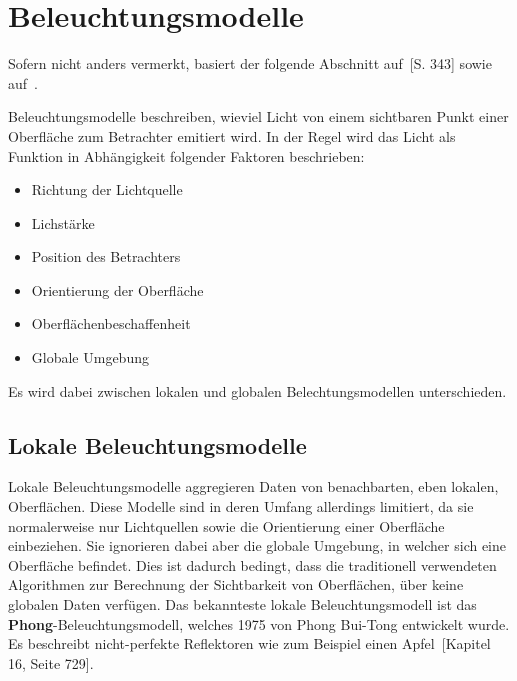 
\section{Beleuchtungsmodelle}
\label{sec:illumination_models}

Sofern nicht anders vermerkt, basiert der folgende Abschnitt auf~\cite{whitted_improved_1980}[S. 343] sowie auf~\cite{hughes_computer_2013}.

Beleuchtungsmodelle beschreiben, wieviel Licht von einem sichtbaren Punkt einer Oberfläche zum Betrachter emitiert wird. In der Regel wird das Licht als Funktion in Abhängigkeit folgender Faktoren beschrieben:
\begin{itemize}
    \item Richtung der Lichtquelle \item Lichstärke
    \item Position des Betrachters
    \item Orientierung der Oberfläche
    \item Oberflächenbeschaffenheit
    \item Globale Umgebung
\end{itemize}

Es wird dabei zwischen lokalen und globalen Belechtungsmodellen unterschieden.

\subsection{Lokale Beleuchtungsmodelle}
\label{subsec:local_illumination_models}

Lokale Beleuchtungsmodelle aggregieren Daten von benachbarten, eben lokalen,
Oberflächen. Diese Modelle sind in deren Umfang allerdings limitiert, da sie
normalerweise nur Lichtquellen sowie die Orientierung einer Oberfläche
einbeziehen. Sie ignorieren dabei aber die globale Umgebung, in welcher sich
eine Oberfläche befindet.  Dies ist dadurch bedingt, dass die traditionell
verwendeten Algorithmen zur Berechnung der Sichtbarkeit von Oberflächen, über
keine globalen Daten verfügen. Das bekannteste lokale Beleuchtungsmodell ist
das \textbf{Phong}-Beleuchtungsmodell, welches 1975 von Phong Bui-Tong
entwickelt wurde. Es beschreibt nicht-perfekte Reflektoren wie zum Beispiel einen
Apfel~\cite{foley_computer_1996}[Kapitel 16, Seite 729].

